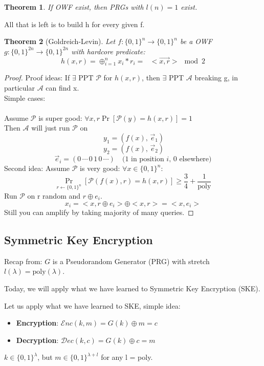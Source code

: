 \documentclass[11pt, a4paper]{article}
\newcommand{\enc}{\mathcal{E}nc}
\newcommand{\dec}{\mathcal{D}ec}
\newcommand{\poly}{\text{poly}}
\newtheorem{thm}{Theorem}
\begin{document}
\begin{thm}
    If OWF exist, then PRGs with $l(n) = 1$ exist.
\end{thm}
All that is left is to build h for every given f.\\
\begin{thm}[Goldreich-Levin]
    Let $f\colon\{0,1\}^n \rightarrow \{0,1\}^n$ be a OWF $g\colon\{0,1\}^{2n} \rightarrow \{0,1\}^{2n}$ with hardcore predicate:
    $$h(x,r) = \oplus_{i=1}^{n}  x_i * r_i =\text{ } <\vec{x,r}>\mod 2$$
\end{thm}
\begin{proof}
    Proof ideas: If $\exists \text{ PPT } \mathcal{P}$ for $h(x,r)$, then $\exists$ PPT $\mathcal{A}$ breaking g, in particular $\mathcal{A}$ can find x.\\
    Simple cases:\\\\
    Assume $\mathcal{P}$ is super good: $\forall x,r \Pr[\mathcal{P}(y) = h(x,r)] = 1$\\
    Then $\mathcal{A}$ will just run $\mathcal{P}$ on 
     \[
\ y_1 = \left( f(x),\, \vec{e}_1 \right)
\]
\[
\ y_2 = \left( f(x),\, \vec{e}_2 \right)
\]
\[
\vec{e}_i = (0\,\cdots\,0\,1\,0\,\cdots) \quad \text{($1$ in position $i$, $0$ elsewhere)}
\]
Second idea: Assume $\mathcal{P}$ is very good: $\forall x \in \{0,1\}^n$:\\
$$\Pr_{r \leftarrow \{0,1\}^n}[\mathcal{P}(f(x),r) = h(x,r)] \geq \frac{3}{4} + \frac{1}{\text{poly}}$$
Run $\mathcal{P}$ on r random and $r \oplus e_i$.
$$x_i = <x,r\oplus e_i> \oplus <x,r> = <x,e_i>$$
Still you can amplify by taking majority of many queries.
\end{proof}
\subsection{Symmetric Key Encryption}
Recap from: $G$ is a Pseudorandom Generator (PRG) with stretch $l(\lambda) = \poly(\lambda)$.

Today, we will apply what we have learned to Symmetric Key Encryption (SKE).

Let us apply what we have learned to SKE, simple idea:
\begin{itemize}
    \item \textbf{Encryption}: $\enc(k, m) = G(k) \oplus m = c$
    \item \textbf{Decryption}: $\dec(k, c) = G(k) \oplus c = m$
\end{itemize}
$k \in \{0,1\}^\lambda$, but $m \in \{0,1\}^{\lambda + l}$ for any l = poly.
\end{document}
